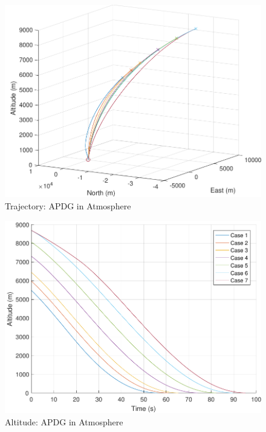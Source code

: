 \begin{figure}[H]
	\centering
	\begin{minipage}{4.3 in}
		\includegraphics[width=\linewidth]{Figures/trajpowatmo.pdf}
		\caption{Trajectory: APDG in Atmosphere \label{fig:trajpowatmo} }
	\end{minipage}
\end{figure}

\begin{figure}[H]
	\centering
	\begin{minipage}{4.3 in}
		\includegraphics[width=\linewidth]{Figures/altpowatmo.pdf}
		\caption{Altitude: APDG in Atmosphere \label{fig:altpowatmo} }
	\end{minipage}
\end{figure}


